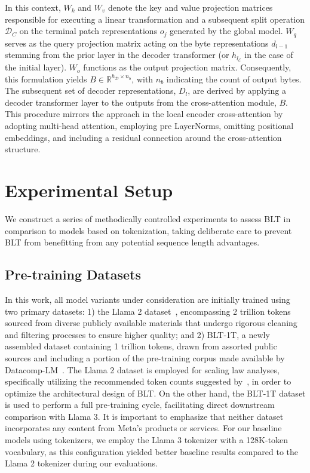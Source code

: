 In this context, $W_k$ and $W_v$ denote the key and value projection matrices responsible for executing a linear transformation and a subsequent split operation $\mathcal{D}_C$ on the terminal patch representations $o_j$ generated by the global model. $W_q$ serves as the query projection matrix acting on the byte representations $d_{l-1}$ stemming from the prior layer in the decoder transformer (or $h_{l_{\mathcal{E}}}$ in the case of the initial layer). $W_o$ functions as the output projection matrix. Consequently, this formulation yields $B \in \mathbb{R}^{h_{\mathcal{D}} \times n_b}$, with $n_b$ indicating the count of output bytes. The subsequent set of decoder representations, $D_l$, are derived by applying a decoder transformer layer to the outputs from the cross-attention module, $B$. This procedure mirrors the approach in the local encoder cross-attention by adopting multi-head attention, employing pre LayerNorms, omitting positional embeddings, and including a residual connection around the cross-attention structure.

\section{Experimental Setup}
\label{section:experiments}
We construct a series of methodically controlled experiments to assess {\textsc BLT} in comparison to models based on tokenization, taking deliberate care to prevent {\textsc BLT} from benefitting from any potential sequence length advantages.

\subsection{Pre-training Datasets} In this work, all model variants under consideration are initially trained using two primary datasets: 1) the Llama 2 dataset~\citep{touvron2023llama}, encompassing 2 trillion tokens sourced from diverse publicly available materials that undergo rigorous cleaning and filtering processes to ensure higher quality; and 2) {\textsc BLT}-1T, a newly assembled dataset containing 1 trillion tokens, drawn from assorted public sources and including a portion of the pre-training corpus made available by Datacomp-LM~\citep{li2024datacomp}. The Llama 2 dataset is employed for scaling law analyses, specifically utilizing the recommended token counts suggested by~\cite{dubey2024llama}, in order to optimize the architectural design of {\textsc BLT}. On the other hand, the {\textsc BLT}-1T dataset is used to perform a full pre-training cycle, facilitating direct downstream comparison with Llama 3. It is important to emphasize that neither dataset incorporates any content from Meta’s products or services. For our baseline models using tokenizers, we employ the Llama 3 tokenizer with a 128K-token vocabulary, as this configuration yielded better baseline results compared to the Llama 2 tokenizer during our evaluations.

